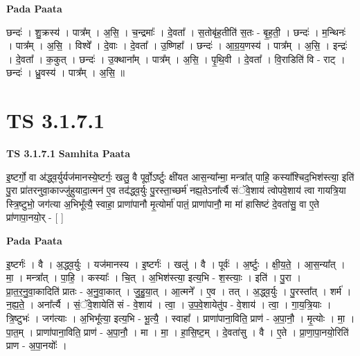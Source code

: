 \documentclass[17pt]{extarticle}
\begin{document}
\textbf{Pada Paata} \newline

छन्दः॑ । शु॒क्रस्य॑ । पात्र᳚म् । अ॒सि॒ । च॒न्द्रमाः᳚ । दे॒वता᳚ । स॒तोबृ॑ह॒तीति॑ स॒तः - बृ॒ह॒ती॒ । छन्दः॑ । म॒न्थिनः॑ । पात्र᳚म् । अ॒सि॒ । विश्वे᳚ । दे॒वाः । दे॒वता᳚ । उ॒ष्णिहा᳚ । छन्दः॑ । आ॒ग्र॒य॒णस्य॑ । पात्र᳚म् । अ॒सि॒ । इन्द्रः॑ । दे॒वता᳚ । क॒कुत् । छन्दः॑ । उ॒क्थाना᳚म् । पात्र᳚म् । अ॒सि॒ । पृ॒थि॒वी । दे॒वता᳚ । वि॒राडिति॑ वि - राट् । छन्दः॑ । ध्रु॒वस्य॑ । पात्र᳚म् । अ॒सि॒ ॥  \newline




\section*{ TS 3.1.7.1 }

\textbf{TS 3.1.7.1 } \newline
\textbf{Samhita Paata} \newline

इ॒ष्टर्गो॒ वा अ॑द्ध्व॒र्युर्यज॑मानस्ये॒ष्टर्गः॒ खलु॒ वै पूर्वो॒ऽर्ष्टुः क्षी॑यत आस॒न्या᳚न्मा॒ मन्त्रा᳚त् पाहि॒ कस्या᳚श्चिद॒भिश॑स्त्या॒ इति॑ पु॒रा प्रा॑तरनुवा॒काज्जु॑हुयादा॒त्मन॑ ए॒व तद॑द्ध्व॒र्युः पु॒रस्ता॒च्छर्म॑ नह्य॒तेऽना᳚र्त्यै संॅवे॒शाय॑ त्वोपवे॒शाय॑ त्वा गायत्रि॒या स्त्रि॒ष्टुभो॒ जग॑त्या अ॒भिभू᳚त्यै॒ स्वाहा॒ प्राणा॑पानौ मृ॒त्योर्मा॑ पातं॒ प्राणा॑पानौ॒ मा मा॑ हासिष्टं दे॒वता॑सु॒ वा ए॒ते प्रा॑णापा॒नयो॒र् - [  ] \newline

\textbf{Pada Paata} \newline

इ॒ष्टर्गः॑ । वै । अ॒द्ध्व॒र्युः । यज॑मानस्य । इ॒ष्टर्गः॑ । खलु॑ । वै । पूर्वः॑ । अ॒र्ष्टुः । क्षी॒य॒ते॒ । आ॒स॒न्या᳚त् । मा॒ । मन्त्रा᳚त् । पा॒हि॒ । कस्याः᳚ । चि॒त् । अ॒भिश॑स्त्या॒ इत्य॒भि - श॒स्त्याः॒ । इति॑ । पु॒रा । प्रा॒त॒र॒नु॒वा॒कादिति॑ प्रातः - अ॒नु॒वा॒कात् । जु॒हु॒या॒त् । आ॒त्मने᳚ । ए॒व । तत् । अ॒द्ध्व॒र्युः । पु॒रस्ता᳚त् । शर्म॑ । न॒ह्य॒ते॒ । अना᳚र्त्यै । सं॒ॅवे॒शायेति॑ सं - वे॒शाय॑ । त्वा॒ । उ॒प॒वे॒शायेतु॑प - वे॒शाय॑ । त्वा॒ । गा॒य॒त्रि॒याः । त्रि॒ष्टुभः॑ । जग॑त्याः । अ॒भिभू᳚त्या॒ इत्य॒भि - भू॒त्यै॒ । स्वाहा᳚ । प्राणा॑पाना॒विति॒ प्राण॑ - अ॒पा॒नौ॒ । मृ॒त्योः । मा॒ । पा॒त॒म् । प्राणा॑पाना॒विति॒ प्राण॑ - अ॒पा॒नौ॒ । मा । मा॒ । हा॒सि॒ष्ट॒म् । दे॒वता॑सु । वै । ए॒ते । प्रा॒णा॒पा॒नयो॒रिति॑ प्राण - अ॒पा॒नयोः᳚ ।  \newline
\end{document}
